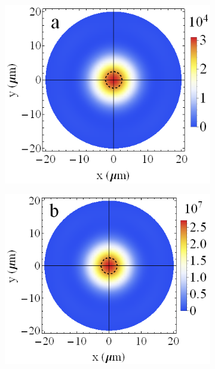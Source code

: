 \documentclass[aps,prapplied,amsmath,amssymb,onecolumn,superscriptaddress,showpacs,floatfix,longbibliography]{revtex4-1}
\begin{document}
\begin{figure}[h]
	\centering
	\begin{subfigure}[h]{0.32\linewidth}
		\includegraphics[width=\linewidth]{Fig3a.png}
	\end{subfigure}
	\begin{subfigure}[h]{0.32\linewidth}
		\includegraphics[width=\linewidth]{Fig3b.png}
	\end{subfigure}
	\begin{subfigure}[h]{0.32\linewidth}

\end{subfigure}
\end{figure}
\end{document}
